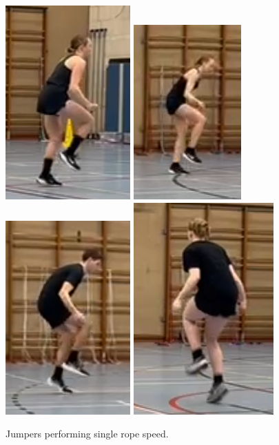 \begin{figure}
    \centering
    \includegraphics[width=0.32\linewidth]{img/sr-speed-c}
    \includegraphics[width=0.32\linewidth]{img/sr-speed-le}
    \includegraphics[width=0.32\linewidth]{img/sr-speed-m}
    \includegraphics[width=0.4\linewidth]{img/sr-speed-lo}
    \label{fig:sr-speed-c}
    \caption[Jumpers performing single rope speed]{Jumpers performing single rope speed.}
\end{figure}

